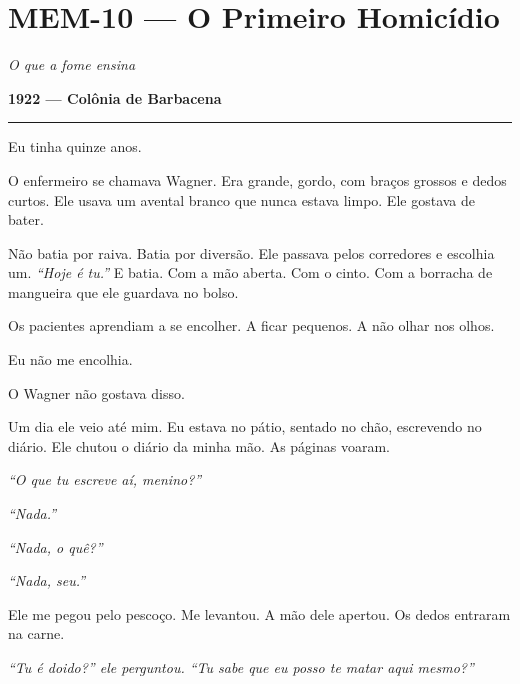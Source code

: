 \section*{\textbf{MEM-10} --- O Primeiro Homicídio}

\noindent \textit{O que a fome ensina}

\noindent \textbf{1922 --- Colônia de Barbacena}

\vspace{0.5em}\noindent\rule{\textwidth}{0.5pt}\vspace{0.5em}

\noindent Eu tinha quinze anos.

\noindent O enfermeiro se chamava Wagner. Era grande, gordo, com braços grossos e dedos curtos. Ele usava um avental branco que nunca estava limpo. Ele gostava de bater.

\noindent Não batia por raiva. Batia por diversão. Ele passava pelos corredores e escolhia um. \textit{\textquotedblleft{}Hoje é tu.\textquotedblright{}} E batia. Com a mão aberta. Com o cinto. Com a borracha de mangueira que ele guardava no bolso.

\noindent Os pacientes aprendiam a se encolher. A ficar pequenos. A não olhar nos olhos.

\noindent Eu não me encolhia.

\noindent O Wagner não gostava disso.

\noindent Um dia ele veio até mim. Eu estava no pátio, sentado no chão, escrevendo no diário. Ele chutou o diário da minha mão. As páginas voaram.

\noindent \textit{\textquotedblleft{}O que tu escreve aí, menino?\textquotedblright{}}

\noindent \textit{\textquotedblleft{}Nada.\textquotedblright{}}

\noindent \textit{\textquotedblleft{}Nada, o quê?\textquotedblright{}}

\noindent \textit{\textquotedblleft{}Nada, seu.\textquotedblright{}}

\noindent Ele me pegou pelo pescoço. Me levantou. A mão dele apertou. Os dedos entraram na carne.

\noindent \textit{\textquotedblleft{}Tu é doido?\textquotedblright{}\textit{ ele perguntou. }\textquotedblleft{}Tu sabe que eu posso te matar aqui mesmo?\textquotedblright{}}

